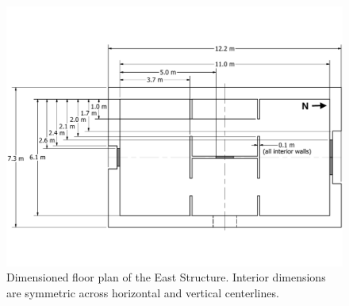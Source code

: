\documentclass[12pt,oneside]{book}
\begin{document}
\begin{figure}[!ht]
	\includegraphics[width=\columnwidth]{../Figures/Floor_Plans/East_Test_Structure_Dimensioned_Full}
	\caption[Dimensioned floor plan of the East Structure.]{Dimensioned floor plan of the East Structure. Interior dimensions are symmetric across horizontal and vertical centerlines.}
	\label{fig:east_dimensioned_plan}
\end{figure}
\end{document}
